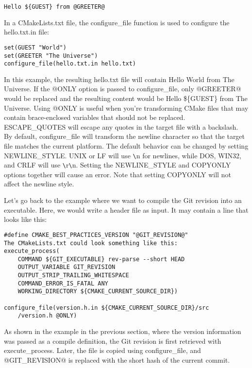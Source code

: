\begin{lstlisting}[style=styleCMake]
Hello ${GUEST} from @GREETER@
\end{lstlisting}

In a CMakeLists.txt file, the configure\_file function is used to configure the hello.txt.in file:

\begin{lstlisting}[style=styleCMake]
set(GUEST "World")
set(GREETER "The Universe")
configure_file(hello.txt.in hello.txt)
\end{lstlisting}

In this example, the resulting hello.txt file will contain Hello World from The Universe. If the @ONLY option is passed to configure\_file, only @GREETER@ would be replaced and the resulting content would be Hello \$\{GUEST\} from The Universe. Using @ONLY is useful when you're transforming CMake files that may contain brace-enclosed variables that should not be replaced. ESCAPE\_QUOTES will escape any quotes in the target file with a backslash. By default, configure\_file will transform the newline character so that the target file matches the current platform. The default behavior can be changed by setting NEWLINE\_STYLE. UNIX or LF will use \verb|\|n for newlines, while DOS, WIN32, and CRLF will use \verb|\|r\verb|\|n. Setting the NEWLINE\_STYLE and COPYONLY options together will cause an error. Note that setting COPYONLY will not affect the newline style.

Let's go back to the example where we want to compile the Git revision into an executable. Here, we would write a header file as input. It may contain a line that looks like this:

\begin{lstlisting}[style=styleCMake]
#define CMAKE_BEST_PRACTICES_VERSION "@GIT_REVISION@"
The CMakeLists.txt could look something like this:
execute_process(
	COMMAND ${GIT_EXECUTABLE} rev-parse --short HEAD
	OUTPUT_VARIABLE GIT_REVISION
	OUTPUT_STRIP_TRAILING_WHITESPACE
	COMMAND_ERROR_IS_FATAL ANY
	WORKING_DIRECTORY ${CMAKE_CURRENT_SOURCE_DIR})

configure_file(version.h.in ${CMAKE_CURRENT_SOURCE_DIR}/src
	/version.h @ONLY)
\end{lstlisting}

As shown in the example in the previous section, where the version information was passed as a compile definition, the Git revision is first retrieved with execute\_process. Later, the file is copied using configure\_file, and @GIT\_REVISION@ is replaced with the short hash of the current commit.

